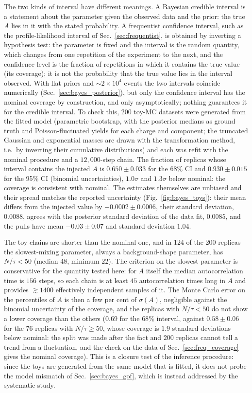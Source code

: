 The two kinds of interval have different meanings. A Bayesian credible interval is a statement about the parameter given the observed data and the prior: the true $A$ lies in it with the stated probability. A frequentist confidence interval, such as the profile-likelihood interval of Sec.~\ref{sec:frequentist}, is obtained by inverting a hypothesis test: the parameter is fixed and the interval is the random quantity, which changes from one repetition of the experiment to the next, and the confidence level is the fraction of repetitions in which it contains the true value (its coverage); it is not the probability that the true value lies in the interval observed. With flat priors and $\sim2\times10^4$ events the two intervals coincide numerically (Sec.~\ref{sec:bayes_posterior}), but only the confidence interval has the nominal coverage by construction, and only asymptotically; nothing guarantees it for the credible interval. To check this, 200 toy-MC datasets were generated from the fitted model (parametric bootstrap, with the posterior medians as ground truth and Poisson-fluctuated yields for each charge and component; the truncated Gaussian and exponential masses are drawn with the transformation method, i.e.\ by inverting their cumulative distributions) and each was refit with the nominal procedure and a $12{,}000$-step chain. The fraction of replicas whose interval contains the injected $A$ is $0.650\pm0.033$ for the 68\% CI and $0.930\pm0.015$ for the 95\% CI (binomial uncertainties), $1.0\sigma$ and $1.3\sigma$ below nominal: the coverage is consistent with nominal. The estimates themselves are unbiased and their spread matches the reported uncertainty (Fig.~\ref{fig:bayes_toys}): their mean differs from the injected value by $-0.0002\pm0.0006$, their standard deviation, $0.0088$, agrees with the posterior standard deviation of the data fit, $0.0085$, and the pulls have mean $-0.03\pm0.07$ and standard deviation $1.04$.

The toy chains are shorter than the nominal one, and in 124 of the 200 replicas the slowest-mixing parameter, always a background-shape parameter, has $N/\tau<50$ (median $48$, minimum $22$). The criterion on the slowest parameter is conservative for the quantity tested here: for $A$ itself the median autocorrelation time is $156$ steps, so each chain is at least $45$ autocorrelation times long in $A$ and provides $\gtrsim1400$ effectively independent samples of it. The Monte Carlo error on the percentiles of $A$ is then a few per cent of $\sigma(A)$, negligible against the binomial uncertainty of the coverage, and the replicas with $N/\tau<50$ do not show a lower coverage than the others ($0.69$ for the $68\%$ interval, against $0.58\pm0.06$ for the $76$ replicas with $N/\tau\geq50$, whose coverage is $1.9$ standard deviations below nominal: the split was made after the fact and $200$ replicas cannot tell a trend from a fluctuation, and the check on the data of Sec.~\ref{sec:freq_coverage} gives the nominal coverage). This is a closure test of the inference procedure: since the toys are generated from the same model that is fitted, it does not probe the model mismatch of Sec.~\ref{sec:bayes_gof}, which is instead addressed by the systematic study.

